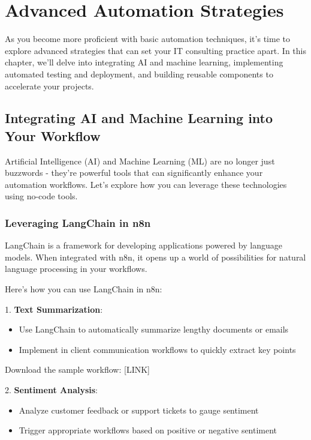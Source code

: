 \chapter{Advanced Automation Strategies}

As you become more proficient with basic automation techniques, it's time to explore advanced strategies that can set your IT consulting practice apart. In this chapter, we'll delve into integrating AI and machine learning, implementing automated testing and deployment, and building reusable components to accelerate your projects.

\section{Integrating AI and Machine Learning into Your Workflow}

Artificial Intelligence (AI) and Machine Learning (ML) are no longer just buzzwords - they're powerful tools that can significantly enhance your automation workflows. Let's explore how you can leverage these technologies using no-code tools.

\subsection{Leveraging LangChain in n8n}

LangChain is a framework for developing applications powered by language models. When integrated with n8n, it opens up a world of possibilities for natural language processing in your workflows.

Here's how you can use LangChain in n8n:

1. \textbf{Text Summarization}:
   \begin{itemize}
     \item Use LangChain to automatically summarize lengthy documents or emails
     \item Implement in client communication workflows to quickly extract key points
   \end{itemize}



   Download the sample workflow: [LINK]

2. \textbf{Sentiment Analysis}:
   \begin{itemize}
     \item Analyze customer feedback or support tickets to gauge sentiment
     \item Trigger appropriate workflows based on positive or negative sentiment
   \end{itemize}

